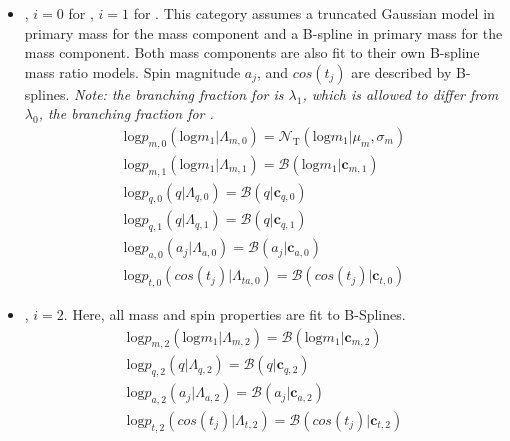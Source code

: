 \begin{itemize}
    \item \popA{}, $i=0$ for \first{}, $i=1$ for \contA{}. This category assumes a truncated Gaussian model in primary mass for the \first{} mass component and a B-spline in primary mass for the \contA{} mass component. Both mass components are also fit to their own B-spline mass ratio models. Spin magnitude $a_j$, and $cos(t_{j})$ are described by B-splines. \textit{Note: the branching fraction for \contA{} is $\lambda_1$, which is allowed to differ from $\lambda_0$, the branching fraction for \first{}.}
    \begin{eqnarray} \label{eq:peakAcomp}
        \text{log} p_{m,0}(\text{log} m_1| \Lambda_{m,0}) = \mathcal{N}_\text{T}(\text{log}m_1 | \mu_{m}, \sigma_{m}) \\
        \text{log} p_{m,1}(\text{log} m_1| \Lambda_{m,1}) = \mathcal{B}(\text{log} m_1 | \mathbf{c}_{m, 1}) \\
        \text{log} p_{q,0}(q| \Lambda_{q,0}) = \mathcal{B}(q | \mathbf{c}_{q,0}) \\
        \text{log} p_{q,1}(q| \Lambda_{q,1}) = \mathcal{B}(q | \mathbf{c}_{q,1}) \\
        \text{log} p_{a,0}(a_j| \Lambda_{a,0}) = \mathcal{B}(a_j | \mathbf{c}_{a,0}) \\
        \text{log} p_{t,0}(cos(t_j)| \Lambda_{ta,0}) = \mathcal{B}( cos(t_j) | \mathbf{c}_{t,0})
    \end{eqnarray}

    \item \popB{}, $i=2$. Here, all mass and spin properties are fit to B-Splines.
    \begin{eqnarray} \label{eq:contBcomp}
        \text{log} p_{m,2}(\text{log}m_1| \Lambda_{m,2}) = \mathcal{B}(\text{log}m_1 | \mathbf{c}_{m, 2}) \\
        \text{log} p_{q,2}(q| \Lambda_{q,2}) = \mathcal{B}(q | \mathbf{c}_{q,2}) \\
        \text{log} p_{a,2}(a_j| \Lambda_{a,2}) = \mathcal{B}(a_j | \mathbf{c}_{a,2}) \\
        \text{log} p_{t,2}(cos(t_j)| \Lambda_{t,2}) = \mathcal{B}( cos(t_j) | \mathbf{c}_{t,2})
    \end{eqnarray}
\end{itemize}